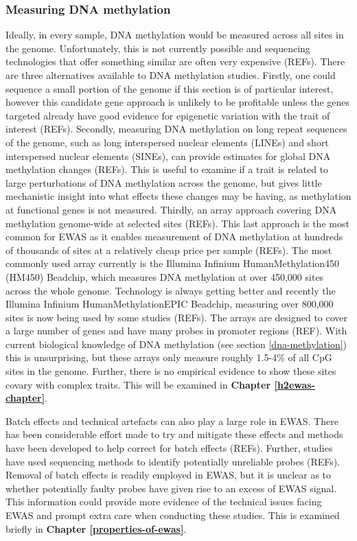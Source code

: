 \documentclass[11pt,twoside]{bristolthesis}
\begin{document}
\hypertarget{measuring-dna-methylation}{%
\subsubsection{Measuring DNA methylation}\label{measuring-dna-methylation}}

Ideally, in every sample, DNA methylation would be measured across all sites in the genome. Unfortunately, this is not currently possible and sequencing technologies that offer something similar are often very expensive (REFs). There are three alternatives available to DNA methylation studies. Firstly, one could sequence a small portion of the genome if this section is of particular interest, however this candidate gene approach is unlikely to be profitable unless the genes targeted already have good evidence for epigenetic variation with the trait of interest (REFs). Secondly, measuring DNA methylation on long repeat sequences of the genome, such as long interspersed nuclear elements (LINEs) and short interspersed nuclear elements (SINEs), can provide estimates for global DNA methylation changes (REFs). This is useful to examine if a trait is related to large perturbations of DNA methylation across the genome, but gives little mechanistic insight into what effects these changes may be having, as methylation at functional genes is not measured. Thirdly, an array approach covering DNA methylation genome-wide at selected sites (REFs). This last approach is the most common for EWAS as it enables measurement of DNA methylation at hundreds of thousands of sites at a relatively cheap price per sample (REFs). The most commonly used array currently is the Illumina Infinium HumanMethylation450 (HM450) Beadchip, which measures DNA methylation at over 450,000 sites across the whole genome. Technology is always getting better and recently the Illumina Infinium HumanMethylationEPIC Beadchip, measuring over 800,000 sites is now being used by some studies (REFs). The arrays are designed to cover a large number of genes and have many probes in promoter regions (REF). With current biological knowledge of DNA methylation (see section \ref{dna-methylation}) this is unsurprising, but these arrays only measure roughly 1.5-4\% of all CpG sites in the genome. Further, there is no empirical evidence to show these sites covary with complex traits. This will be examined in \textbf{Chapter \ref{h2ewas-chapter}}.

Batch effects and technical artefacts can also play a large role in EWAS. There has been considerable effort made to try and mitigate these effects and methods have been developed to help correct for batch effects (REFs). Further, studies have used sequencing methods to identify potentially unreliable probes (REFs). Removal of batch effects is readily employed in EWAS, but it is unclear as to whether potentially faulty probes have given rise to an excess of EWAS signal. This information could provide more evidence of the technical issues facing EWAS and prompt extra care when conducting these studies. This is examined briefly in \textbf{Chapter \ref{properties-of-ewas}}.
\end{document}
